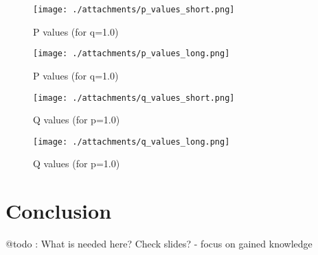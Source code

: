\documentclass[a4paper,10pt]{article}
\begin{document}
\begin{figure}[!tbp]
  \centering
  \begin{minipage}[b]{0.49\textwidth}
    \texttt{[image: ./attachments/p\_values\_short.png]}
    \caption{P values (for q=1.0)}
    \label{fig:q-values}
  \end{minipage}
  \hfill
  \begin{minipage}[b]{0.49\textwidth}
    \texttt{[image: ./attachments/p\_values\_long.png]}
    \caption{P values (for q=1.0)}
    \label{fig:p-values}
  \end{minipage}
\end{figure}

\begin{figure}[!tbp]
  \centering
  \begin{minipage}[b]{0.49\textwidth}
    \texttt{[image: ./attachments/q\_values\_short.png]}
    \caption{Q values (for p=1.0)}
    \label{fig:q-values}
  \end{minipage}
  \hfill
  \begin{minipage}[b]{0.49\textwidth}
    \texttt{[image: ./attachments/q\_values\_long.png]}
    \caption{Q values (for p=1.0)}
    \label{fig:p-values}
  \end{minipage}
\end{figure}

\section{Conclusion}

@todo : What is needed here? Check slides?
- focus on gained knowledge


\end{document}
